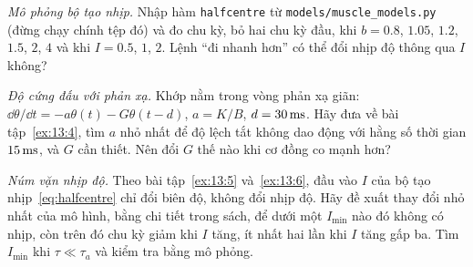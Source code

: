 \begin{exercise}[\lvlB]
\label{ex:13:6}
\emph{Mô phỏng bộ tạo nhịp.} Nhập hàm \texttt{halfcentre} từ \texttt{models/\allowbreak muscle\_models.py} (đừng chạy chính tệp đó) và đo chu kỳ, bỏ hai chu kỳ đầu, khi $b=0.8$, $1.05$, $1.2$, $1.5$, $2$, $4$ và khi $I=0.5$, $1$, $2$. Lệnh ``đi nhanh hơn'' có thể đổi nhịp độ thông qua $I$ không?
\end{exercise}

\begin{exercise}[\lvlB]
\label{ex:13:7}
\emph{Độ cứng đấu với phản xạ.} Khớp nằm trong vòng phản xạ giãn: $\dd\theta/\dd t=-a\theta(t)-G\theta(t-d)$, $a=K/B$, $d=30\,\text{ms}$. Hãy đưa về bài tập~\ref{ex:13:4}, tìm $a$ nhỏ nhất để độ lệch tắt không dao động với hằng số thời gian $15\,\text{ms}$, và $G$ cần thiết. Nên đổi $G$ thế nào khi cơ đồng co mạnh hơn?
\end{exercise}

\begin{exercise}[\lvlC]
\label{ex:13:8}
\emph{Núm vặn nhịp độ.} Theo bài tập~\ref{ex:13:5} và~\ref{ex:13:6}, đầu vào $I$ của bộ tạo nhịp~\eqref{eq:halfcentre} chỉ đổi biên độ, không đổi nhịp độ. Hãy đề xuất thay đổi nhỏ nhất của mô hình, bằng chi tiết trong sách, để dưới một $I_{\min}$ nào đó không có nhịp, còn trên đó chu kỳ giảm khi $I$ tăng, ít nhất hai lần khi $I$ tăng gấp ba. Tìm $I_{\min}$ khi $\tau\ll\tau_a$ và kiểm tra bằng mô phỏng.
\end{exercise}

